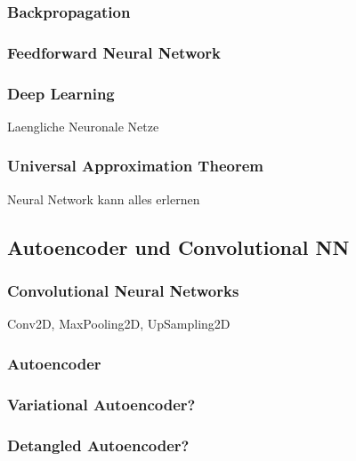 \documentclass[../main]{subfiles}
\begin{document}
\subsubsection{Backpropagation}
\subsubsection{Feedforward Neural Network}
\subsubsection{Deep Learning}
Laengliche Neuronale Netze
\subsubsection{Universal Approximation Theorem}
Neural Network kann alles erlernen

\subsection{Autoencoder und Convolutional NN}
\subsubsection{Convolutional Neural Networks}
Conv2D, MaxPooling2D, UpSampling2D
\subsubsection{Autoencoder}
\subsubsection{Variational Autoencoder?}
\subsubsection{Detangled Autoencoder?}
\end{document}
